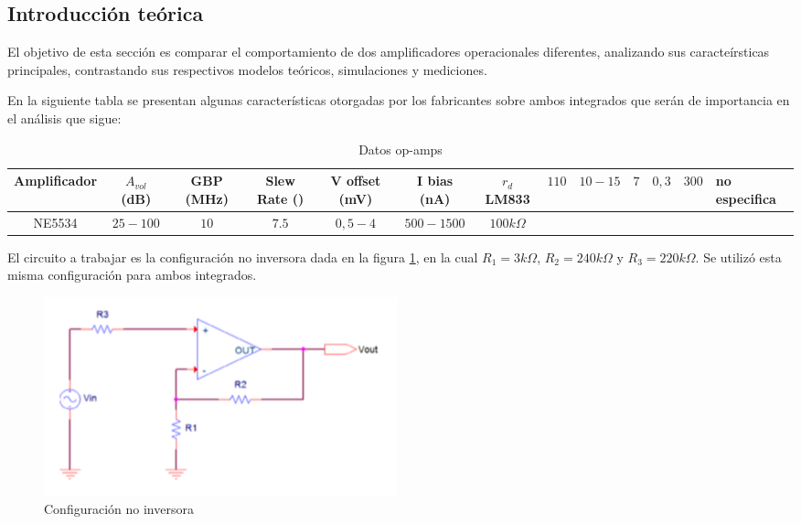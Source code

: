 
\subsection{Introducción teórica}


El objetivo de esta sección es comparar el comportamiento de dos amplificadores operacionales diferentes, analizando sus caracteírsticas principales, contrastando sus respectivos modelos teóricos, simulaciones y mediciones.

En la siguiente tabla se presentan algunas características otorgadas por los fabricantes sobre ambos integrados que serán de importancia en el  análisis que sigue:


\begin{table}[H]
\begin{center}
\begin{tabular}{|c|c|c|c|c|c|c|}
\hline
Amplificador   & $A_{vol}$ (dB)   & GBP (MHz)   & Slew Rate ()   & V offset (mV)  & I bias (nA)  & $r_d$ %
LM833 &  $110$ & $10-15$ & $7$   & $0,3$  & $300$ & no especifica \\ \hline
NE5534 & $25-100$    & $10$  & $7.5$   & $0,5-4$  & $500-1500$&  $100k\Omega$
\\ \hline
\end{tabular}
\caption{Datos op-amps}
\label{tabla:caracteristicas_amps}
\end{center}
\end{table}

El circuito a trabajar es la configuración no inversora dada en la figura \ref{fig:consigna}, en la cual $R_1 = 3k \Omega$, $R_2 = 240k \Omega$ y $R_3 = 220k \Omega$. Se utilizó esta misma configuración para ambos integrados.  


\begin{figure}[H]	
	\centering
	\includegraphics[width=\textwidth]{Ejercicio2/Imagenes/circuito_consigna.png}
	\caption{Configuración no inversora}
	\label{fig:consigna}
\end{figure}

